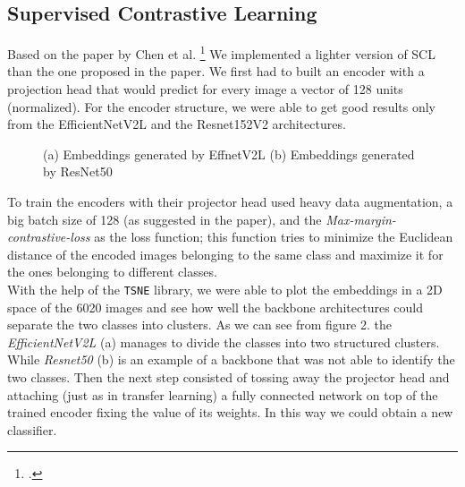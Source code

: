 \documentclass[conference,compsoc,11pt]{IEEEtran}
\begin{document}
\subsection{Supervised Contrastive Learning}\label{sec: tuning}
Based on the paper by Chen et al. \footcite{contrastive}
We implemented a lighter version of SCL than the one proposed in the paper. We first had to built an encoder with a projection head that would predict for every image a vector of 128 units (normalized). For the encoder structure, we were able to get good results only from the EfficientNetV2L and the Resnet152V2 architectures. 

\begin{figure}[H]
    \centering
    \caption{(a) Embeddings generated by EffnetV2L (b) Embeddings generated by ResNet50}
    \label{fig:EMBEDDINGS}
\end{figure}

To train the encoders with their projector head used heavy data augmentation, a big batch size of 128 (as suggested in the paper), and the \textit{Max-margin-contrastive-loss} as the loss function;
this function tries to minimize the Euclidean distance of the encoded images belonging to the same class and maximize it for the ones belonging to different classes.  \\
With the help of the \verb|TSNE| library, we were able to plot the embeddings in a 2D space of the 6020 images and see how well the backbone architectures could separate the two classes into clusters. 
As we can see from figure 2. the \textit{EfficientNetV2L} (a) manages to divide the classes into two structured clusters. While \textit{Resnet50 }(b) is an example of a backbone that was not able to identify the two classes. 
Then the next step consisted of tossing away the projector head and attaching (just as in transfer learning) a fully connected network on top of the trained encoder fixing the value of its weights. In this way we could obtain a new classifier. 
\end{document}
